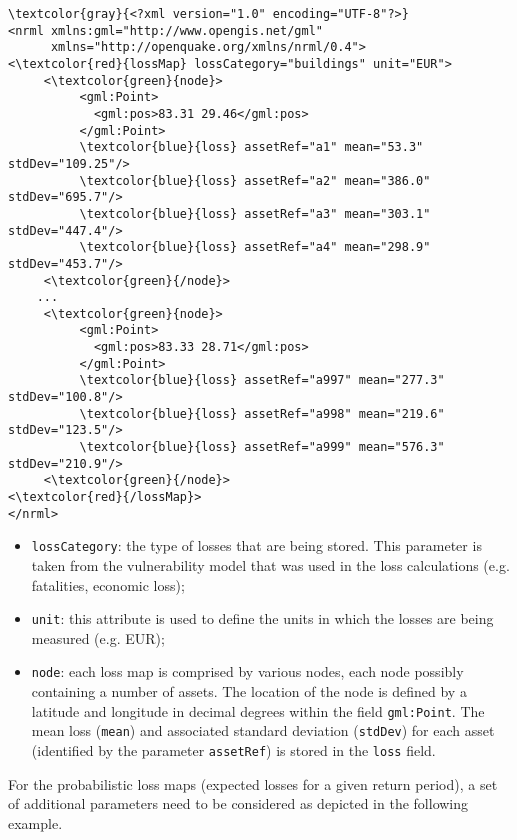 \begin{Verbatim}[frame=single, commandchars=\\\{\}, samepage=false]
\textcolor{gray}{<?xml version="1.0" encoding="UTF-8"?>}
<nrml xmlns:gml="http://www.opengis.net/gml"
      xmlns="http://openquake.org/xmlns/nrml/0.4">
<\textcolor{red}{lossMap} lossCategory="buildings" unit="EUR">
     <\textcolor{green}{node}>
          <gml:Point>
            <gml:pos>83.31 29.46</gml:pos>
          </gml:Point>
          \textcolor{blue}{loss} assetRef="a1" mean="53.3" stdDev="109.25"/>
          \textcolor{blue}{loss} assetRef="a2" mean="386.0" stdDev="695.7"/>
          \textcolor{blue}{loss} assetRef="a3" mean="303.1" stdDev="447.4"/>
          \textcolor{blue}{loss} assetRef="a4" mean="298.9" stdDev="453.7"/>
     <\textcolor{green}{/node}>
    ...
     <\textcolor{green}{node}>
          <gml:Point>
            <gml:pos>83.33 28.71</gml:pos>
          </gml:Point>
          \textcolor{blue}{loss} assetRef="a997" mean="277.3" stdDev="100.8"/>
          \textcolor{blue}{loss} assetRef="a998" mean="219.6" stdDev="123.5"/>
          \textcolor{blue}{loss} assetRef="a999" mean="576.3" stdDev="210.9"/>
     <\textcolor{green}{/node}>
<\textcolor{red}{/lossMap}>
</nrml>
\end{Verbatim}

\begin{itemize}
\item  \Verb+lossCategory+: the type of losses that are being stored. This parameter is taken from the vulnerability model that was used in the loss calculations (e.g. fatalities, economic loss);
\item  \Verb+unit+: this attribute is used to define the units in which the losses are being measured (e.g. EUR);
\item  \Verb+node+: each loss map is comprised by various nodes, each node possibly containing a number of assets. The location of the node is defined by a latitude and longitude in decimal degrees within the field \Verb+gml:Point+. The mean loss (\Verb+mean+) and associated standard deviation (\Verb+stdDev+) for each asset (identified by the parameter \Verb+assetRef+) is stored in the \Verb+loss+ field.
\end{itemize}

For the probabilistic loss maps (expected losses for a given return period), a set of additional parameters need to be considered as depicted in the following example. 

